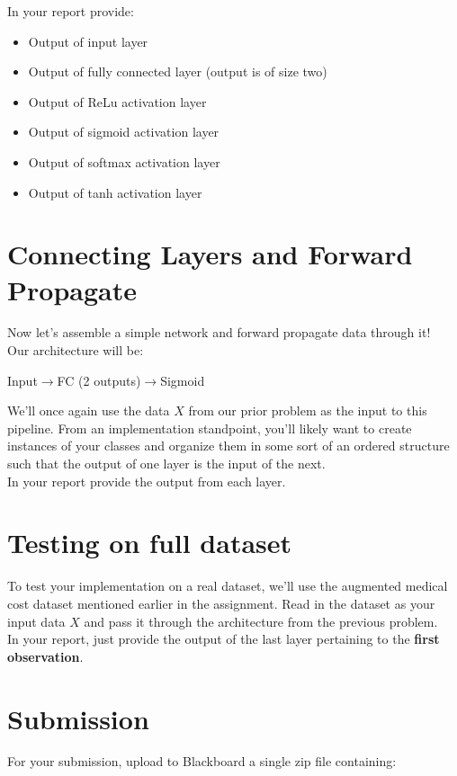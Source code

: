 \documentclass[12pt]{article}
\begin{document}
\noindent
In your report provide:
\begin{itemize}
\item Output of input layer
\item Output of fully connected layer (output is of size two)
\item Output of ReLu activation layer
\item Output of sigmoid activation layer
\item Output of softmax activation layer
\item Output of tanh activation layer

\end{itemize}

\newpage
\section{Connecting Layers and Forward Propagate}
Now let's assemble a simple network and forward propagate data through it!\\


\noindent
Our architecture will be:\\
\begin{center}
Input$\rightarrow$FC (2 outputs)$\rightarrow$Sigmoid
\end{center}

\noindent
We'll once again use the data $X$ from our prior problem as the input to this pipeline.  From an implementation standpoint, you'll likely want to create instances of your classes and organize them in some sort of an ordered structure such that the output of one layer is the input of the next.\\

\noindent  
 In your report provide the output from each layer.

\newpage
\section{Testing on full dataset}
To test your implementation on a real dataset, we'll use the augmented medical cost dataset mentioned earlier in the assignment.  Read in the dataset as your input data $X$ and pass it through the architecture from the previous problem.\\

\noindent
In your report, just provide the output of the last layer pertaining to the \textbf{first observation}.

\newpage
\section*{Submission}
For your submission, upload to Blackboard a single zip file containing:
\end{document}
